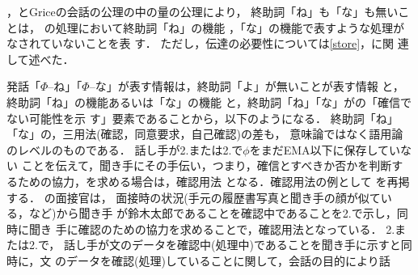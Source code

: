 ，とGriceの会話の公理の中の量の公理により，
終助詞「ね」も「な」も無いことは，
の処理において終助詞「ね」の機能
，「な」の機能で表すような処理がなされていないことを表
す． 
ただし，伝達の必要性については\ref{store}，に関
連して述べた．

発話「\(\Phi\)--ね」「\(\Phi\)--な」が表す情報は，終助詞「よ」が無いことが表す情報
と，終助詞「ね」の機能あるいは「な」の機能
と，終助詞「ね」「な」がの「確信でない可能性を示
す」要素であることから，以下のようになる．
終助詞「ね」「な」の，三用法(確認，同意要求，自己確認)の差も，
意味論ではなく語用論のレベルのものである．
話し手が2.または2.で\(\phi\)をまだEMA以下に保存していない
ことを伝えて，聞き手にその手伝い，つまり，確信とすべきか否かを判断するための協力，を求める場合は，確認用法
となる．確認用法の例として
を再掲する．
の面接官は，
面接時の状況(手元の履歴書写真と聞き手の顔が似ている，など)から聞き手
が鈴木太郎であることを確認中であることを2.で示し，同時に聞き
手に確認のための協力を求めることで，確認用法となっている．
2.または2.で，
話し手が文のデータを確認中(処理中)であることを聞き手に示すと同時に，文
のデータを確認(処理)していることに関して，会話の目的により話
